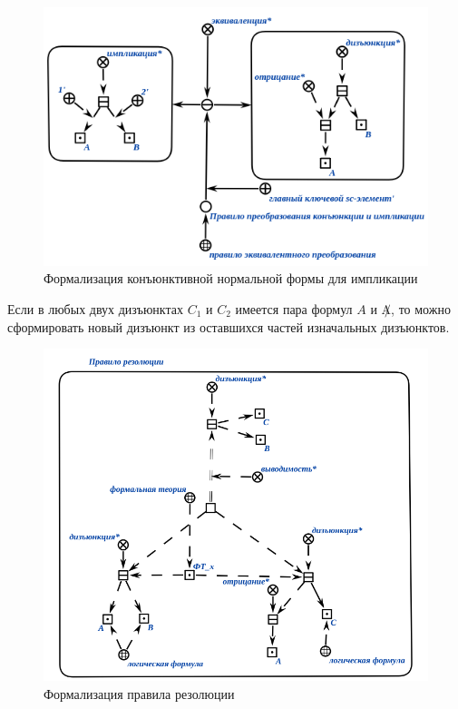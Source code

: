\begin{figure}[H]
	\includegraphics[scale=0.8]{author/part3/figures/conjunction_implication_rule.png}
	\caption{Формализация конъюнктивной нормальной формы для импликации}
	\label{fig:conjunction_implication_rule}
\end{figure}

Если в любых двух дизъюнктах $C_1$ и $C_2$ имеется пара формул $A$ и $\not A$, то можно сформировать новый дизъюнкт из оставшихся частей изначальных дизъюнктов.

\begin{figure}[H]
	\includegraphics[scale=0.8]{author/part3/figures/resolution.png}
	\caption{Формализация правила резолюции}
	\label{fig:resolution}
\end{figure}

